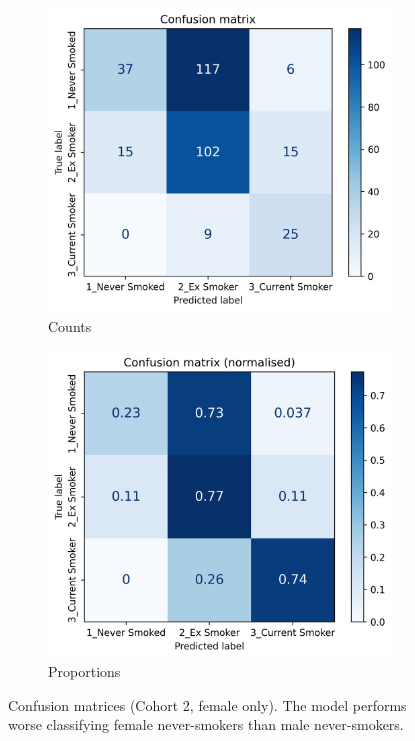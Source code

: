 \documentclass[draft]{article} %
\begin{document}
\begin{figure}[!p]
    \centering
    \begin{subfigure}{0.42\linewidth}
        \centering
        \includegraphics[width=\linewidth]{cohort2/female_only/test_confusion_matrix.png}
        \caption{Counts}
    \end{subfigure}
    \hspace{4mm}
    \begin{subfigure}{0.42\linewidth}
        \centering
        \includegraphics[width=\linewidth]{cohort2/female_only/test_confusion_matrix_normalised.png}
        \caption{Proportions}
    \end{subfigure}
    \caption[Confusion matrices (Cohort 2, female only)]{Confusion matrices (Cohort 2, female only). The model performs worse classifying female never-smokers than male never-smokers.}
    \label{fig:female-only-confusion-matrix}
\end{figure}
\end{document}
